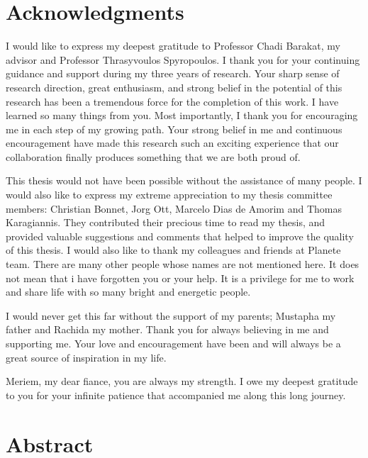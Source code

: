 \documentclass[a4paper,11pt,twoside]{ThesisStyle}
\begin{document}


\dominitoc


\cleardoublepage

\section*{Acknowledgments}

I would like to express my deepest gratitude to Professor Chadi Barakat, my advisor and Professor Thrasyvoulos Spyropoulos. I thank you for your continuing guidance and support during my three years of research. Your sharp sense of research direction, great enthusiasm, and strong belief in the potential of this research has been a tremendous force for the completion of this work. I have learned so many things from you. Most importantly, I thank you for encouraging me in each step of my growing path. Your strong belief in me and continuous encouragement have made this research such an exciting experience that our collaboration finally produces something that we are both proud of.

This thesis would not have been possible without the assistance of many people. I would also like to express my extreme appreciation to my thesis committee members: Christian Bonnet, Jorg Ott, Marcelo Dias de Amorim and Thomas Karagiannis. They contributed their precious time to read my thesis, and provided valuable suggestions and comments that helped to improve the quality of this thesis. I would also like to thank my colleagues and friends at Planete team. There are many other people whose names are not mentioned here. It does not mean that i have forgotten you or your help. It is a privilege for me to work and share life with so many bright and energetic people. 

I would never get this far without the support of my parents; Mustapha my father and Rachida my mother. Thank you for always believing in me and supporting me. Your love and encouragement have been and will always be a great source of inspiration in my life. 

Meriem, my dear fiance, you are always my strength. I owe my deepest gratitude to you for your infinite patience that accompanied me along this long journey.

\cleardoublepage

\section*{Abstract}
\end{document}
